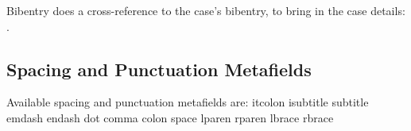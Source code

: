 

Bibentry  does a cross-reference to the case's bibentry, to bring in the case details: .








\subsection{Spacing and Punctuation Metafields}
\p Available spacing and punctuation metafields are:
{ itcolon } 
{ isubtitle } 
{ subtitle } 
{ emdash } 
{ endash } 
{ dot } 
{ comma } 
{ colon } 
{ space } 
{ lparen } 
{ rparen } 
{ lbrace } 
{ rbrace } 

